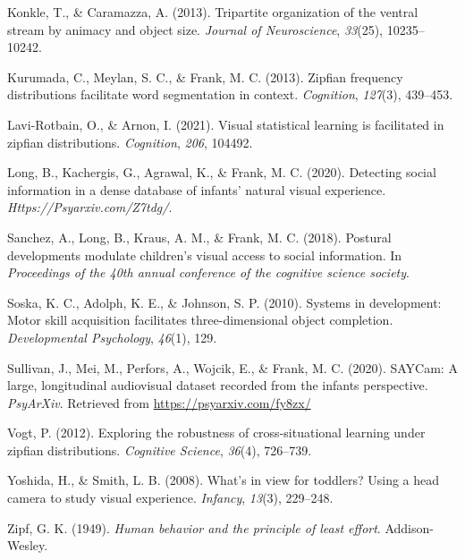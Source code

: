 \documentclass[10pt, letterpaper]{article}
\begin{document}
\leavevmode\hypertarget{ref-konkle2013tripartite}{}%
Konkle, T., \& Caramazza, A. (2013). Tripartite organization of the
ventral stream by animacy and object size. \emph{Journal of
Neuroscience}, \emph{33}(25), 10235--10242.

\leavevmode\hypertarget{ref-kurumada2013zipfian}{}%
Kurumada, C., Meylan, S. C., \& Frank, M. C. (2013). Zipfian frequency
distributions facilitate word segmentation in context. \emph{Cognition},
\emph{127}(3), 439--453.

\leavevmode\hypertarget{ref-lavi2021visual}{}%
Lavi-Rotbain, O., \& Arnon, I. (2021). Visual statistical learning is
facilitated in zipfian distributions. \emph{Cognition}, \emph{206},
104492.

\leavevmode\hypertarget{ref-long2020}{}%
Long, B., Kachergis, G., Agrawal, K., \& Frank, M. C. (2020). Detecting
social information in a dense database of infants' natural visual
experience. \emph{Https://Psyarxiv.com/Z7tdg/}.

\leavevmode\hypertarget{ref-sanchez2018postural}{}%
Sanchez, A., Long, B., Kraus, A. M., \& Frank, M. C. (2018). Postural
developments modulate children's visual access to social information. In
\emph{Proceedings of the 40th annual conference of the cognitive science
society}.

\leavevmode\hypertarget{ref-soska2010systems}{}%
Soska, K. C., Adolph, K. E., \& Johnson, S. P. (2010). Systems in
development: Motor skill acquisition facilitates three-dimensional
object completion. \emph{Developmental Psychology}, \emph{46}(1), 129.

\leavevmode\hypertarget{ref-SAYcam}{}%
Sullivan, J., Mei, M., Perfors, A., Wojcik, E., \& Frank, M. C. (2020).
SAYCam: A large, longitudinal audiovisual dataset recorded from the
infants perspective. \emph{PsyArXiv}. Retrieved from
\url{https://psyarxiv.com/fy8zx/}

\leavevmode\hypertarget{ref-vogt2012}{}%
Vogt, P. (2012). Exploring the robustness of cross-situational learning
under zipfian distributions. \emph{Cognitive Science}, \emph{36}(4),
726--739.

\leavevmode\hypertarget{ref-yoshida2008}{}%
Yoshida, H., \& Smith, L. B. (2008). What's in view for toddlers? Using
a head camera to study visual experience. \emph{Infancy}, \emph{13}(3),
229--248.

\leavevmode\hypertarget{ref-zipf1949}{}%
Zipf, G. K. (1949). \emph{Human behavior and the principle of least
effort}. Addison-Wesley.


\end{document}
